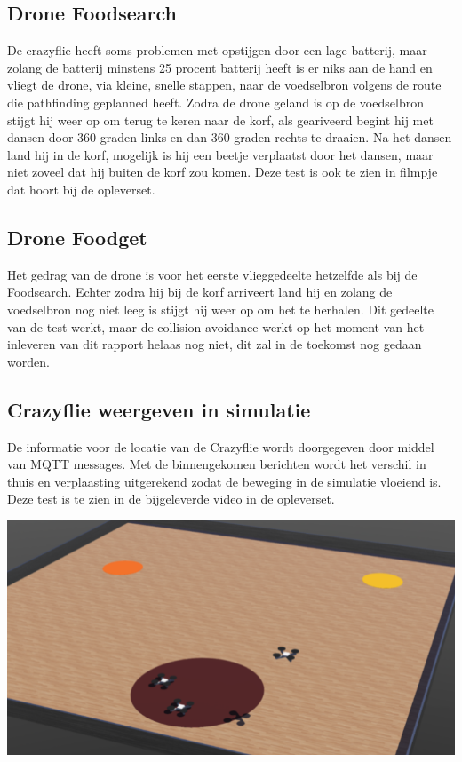 \subsection{Drone Foodsearch}
De crazyflie heeft soms problemen met opstijgen door een lage batterij, maar zolang de batterij minstens 25 procent batterij heeft is er niks aan de hand en vliegt de drone, via kleine, snelle stappen, naar de voedselbron volgens de route die pathfinding geplanned heeft. Zodra de drone geland is op de voedselbron stijgt hij weer op om terug te keren naar de korf, als geariveerd begint hij met dansen door 360 graden links en dan 360 graden rechts te draaien. Na het dansen land hij in de korf, mogelijk is hij een beetje verplaatst door het dansen, maar niet zoveel dat hij buiten de korf zou komen.
Deze test is ook te zien in filmpje dat hoort bij de opleverset.

\subsection{Drone Foodget}
Het gedrag van de drone is voor het eerste vlieggedeelte hetzelfde als bij de Foodsearch. Echter zodra hij bij de korf arriveert land hij en zolang de voedselbron nog niet leeg is stijgt hij weer op om het te herhalen.
Dit gedeelte van de test werkt, maar de collision avoidance werkt op het moment van het inleveren van dit rapport helaas nog niet, dit zal in de toekomst nog gedaan worden.

\subsection{Crazyflie weergeven in simulatie}
De informatie voor de locatie van de Crazyflie wordt doorgegeven door middel van MQTT messages. Met de binnengekomen berichten wordt het verschil in thuis en verplaasting uitgerekend zodat de beweging in de simulatie vloeiend is. Deze test is te zien in de bijgeleverde video in de opleverset.
\begin{center}
    \includegraphics[scale=0.5]{../IMAGES/simdrone.png}
\end{center}